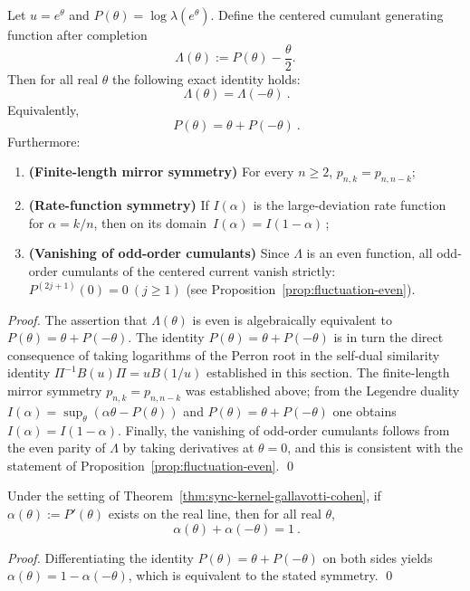 \begin{theorem}\label{thm:sync-kernel-gallavotti-cohen}
Let \(u=e^{\theta}\) and \(P(\theta)=\log\lambda(e^\theta)\). Define the centered cumulant generating function after completion
\[
\Lambda(\theta):=P(\theta)-\frac{\theta}{2}.
\]
Then for all real \(\theta\) the following exact identity holds:
\[
\boxed{\ \Lambda(\theta)=\Lambda(-\theta)\ }.
\]
Equivalently,
\[
\boxed{\ P(\theta)=\theta+P(-\theta)\ }.
\]
Furthermore:
\begin{enumerate}
  \item \textbf{(Finite-length mirror symmetry)} For every \(n\ge 2\), \(p_{n,k}=p_{n,n-k}\);
  \item \textbf{(Rate-function symmetry)} If \(I(\alpha)\) is the large-deviation rate function for \(\alpha=k/n\), then on its domain
  \(\boxed{\,I(\alpha)=I(1-\alpha)\,}\);
  \item \textbf{(Vanishing of odd-order cumulants)} Since \(\Lambda\) is an even function, all odd-order cumulants of the centered current vanish strictly:
  \(P^{(2j+1)}(0)=0\ (j\ge 1)\) (see Proposition~\ref{prop:fluctuation-even}).
\end{enumerate}
\end{theorem}
\begin{proof}
The assertion that \(\Lambda(\theta)\) is even is algebraically equivalent to \(P(\theta)=\theta+P(-\theta)\).
The identity \(P(\theta)=\theta+P(-\theta)\) is in turn the direct consequence of taking logarithms of the Perron root in the self-dual similarity identity \(\Pi^{-1}B(u)\Pi=uB(1/u)\) established in this section.
The finite-length mirror symmetry \(p_{n,k}=p_{n,n-k}\) was established above; from the Legendre duality \(I(\alpha)=\sup_{\theta}(\alpha\theta-P(\theta))\) and \(P(\theta)=\theta+P(-\theta)\) one obtains \(I(\alpha)=I(1-\alpha)\).
Finally, the vanishing of odd-order cumulants follows from the even parity of \(\Lambda\) by taking derivatives at \(\theta=0\), and this is consistent with the statement of Proposition~\ref{prop:fluctuation-even}. \qed
\end{proof}

\begin{corollary}[Slope involution of the self-dual pressure: \texorpdfstring{\(\alpha(\theta)+\alpha(-\theta)=1\)}{alpha(theta)+alpha(-theta)=1}]\label{cor:sync-kernel-gc-slope-involution}
Under the setting of Theorem~\ref{thm:sync-kernel-gallavotti-cohen}, if \(\alpha(\theta):=P'(\theta)\) exists on the real line, then for all real \(\theta\),
\[
\boxed{\ \alpha(\theta)+\alpha(-\theta)=1\ }.
\]
\end{corollary}
\begin{proof}
Differentiating the identity \(P(\theta)=\theta+P(-\theta)\) on both sides yields
\(
\alpha(\theta)=1-\alpha(-\theta)
\), which is equivalent to the stated symmetry. \qed
\end{proof}

